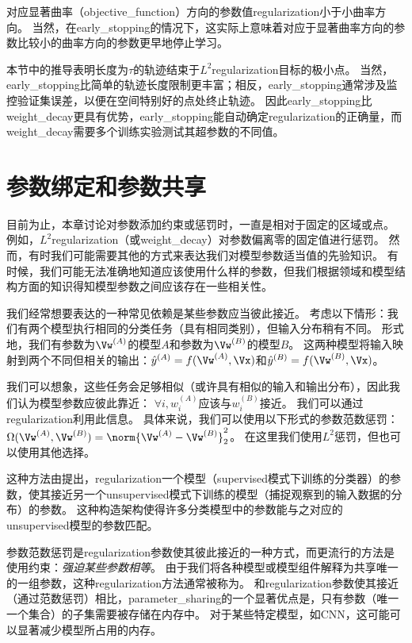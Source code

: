 对应显著曲率（\gls{objective_function}）方向的参数值\gls{regularization}小于小曲率方向。
当然，在\gls{early_stopping}的情况下，这实际上意味着对应于显著曲率方向的参数比较小的曲率方向的参数更早地停止学习。
 
本节中的推导表明长度为$\tau$的轨迹结束于$L^2$\gls{regularization}目标的极小点。
当然，\gls{early_stopping}比简单的轨迹长度限制更丰富；相反，\gls{early_stopping}通常涉及监控验证集误差，以便在空间特别好的点处终止轨迹。
因此\gls{early_stopping}比\gls{weight_decay}更具有优势，\gls{early_stopping}能自动确定\gls{regularization}的正确量，而\gls{weight_decay}需要多个训练实验测试其超参数的不同值。


\section{参数绑定和参数共享}
\label{sec:parameter_tying_and_parameter_sharing}
目前为止，本章讨论对参数添加约束或惩罚时，一直是相对于固定的区域或点。
例如，$L^2$\gls{regularization}（或\gls{weight_decay}）对参数偏离零的固定值进行惩罚。
然而，有时我们可能需要其他的方式来表达我们对模型参数适当值的先验知识。
有时候，我们可能无法准确地知道应该使用什么样的参数，但我们根据领域和模型结构方面的知识得知模型参数之间应该存在一些相关性。

我们经常想要表达的一种常见依赖是某些参数应当彼此接近。
考虑以下情形：我们有两个模型执行相同的分类任务（具有相同类别），但输入分布稍有不同。
形式地，我们有参数为$\Vw^{(A)}$的模型$A$和参数为$\Vw^{(B)}$的模型$B$。
这两种模型将输入映射到两个不同但相关的输出：$\hat y^{(A)} = f(\Vw^{(A)}, \Vx)$和$\hat y^{(B)} = f(\Vw^{(B)}, \Vx)$。

我们可以想象，这些任务会足够相似（或许具有相似的输入和输出分布），因此我们认为模型参数应彼此靠近：
$\forall i, w_i^{(A)}$应该与$ w_i^{(B)}$接近。
我们可以通过\gls{regularization}利用此信息。
具体来说，我们可以使用以下形式的参数范数惩罚：
$\Omega(\Vw^{(A)}, \Vw^{(B)}) = \norm{\Vw^{(A)}-\Vw^{(B)}}_2^2$。
在这里我们使用$L^2$惩罚，但也可以使用其他选择。

这种方法由\cite{Lasserre-et-al-2006}提出，\gls{regularization}一个模型（\gls{supervised}模式下训练的分类器）的参数，使其接近另一个\gls{unsupervised}模式下训练的模型（捕捉观察到的输入数据的分布）的参数。
这种构造架构使得许多分类模型中的参数能与之对应的\gls{unsupervised}模型的参数匹配。

参数范数惩罚是\gls{regularization}参数使其彼此接近的一种方式，而更流行的方法是使用约束：\emph{强迫某些参数相等}。
由于我们将各种模型或模型组件解释为共享唯一的一组参数，这种\gls{regularization}方法通常被称为。
和\gls{regularization}参数使其接近（通过范数惩罚）相比，\gls{parameter_sharing}的一个显著优点是，只有参数（唯一一个集合）的子集需要被存储在内存中。
对于某些特定模型，如\gls{CNN}，这可能可以显著减少模型所占用的内存。


